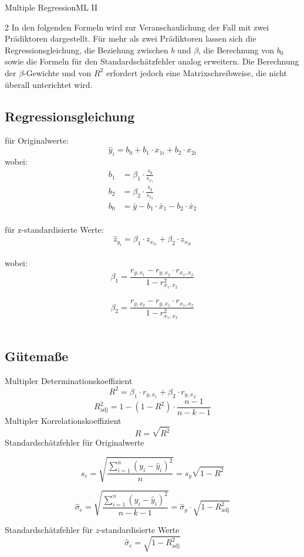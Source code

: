 \begin{formulaBox}{Multiple Regression}{ML II}

 \begin{multicols}{2}
In den folgenden Formeln wird zur Veranschaulichung der Fall mit zwei Prädiktoren dargestellt. 
Für mehr als zwei Prädiktoren lassen sich die Regressionsgleichung, die Beziehung zwischen $b$ und $\beta$, 
die Berechnung von $b_0$ sowie die Formeln für den Standardschätzfehler analog erweitern. 
Die Berechnung der $\beta$-Gewichte und von $R^2$ erfordert jedoch eine Matrixschreibweise, die nicht überall unterichtet wird.

    \subsection*{Regressionsgleichung}
für Originalwerte: $$\hat{y}_i=b_0+b_1 \cdot x_{1i} + b_2 \cdot x_{2i}$$
wobei: 
\begin{align*}
b_1&=\beta_1 \cdot \frac{s_y}{s_{x_{1}}}\\
b_2&=\beta_2 \cdot \frac{s_y}{s_{x_{2}}}\\
b_0&=\bar{y}-b_1 \cdot \bar{x}_{1}-b_2 \cdot \bar{x}_2\\
\end{align*}

für z-standardisierte Werte: $$\hat{z}_{y_i}=\beta_1\cdot z_{x_{1i}} + \beta_2\cdot z_{x_{2i}}$$ \\
wobei: $$\beta_1=\frac{r_{y,x_1}-r_{y,x_2}\cdot r_{x_1,x_2}}{1-r^2_{x_1,x_2}}$$ \ $$\beta_2=\frac{r_{y,x_2}-r_{y,x_1} \cdot r_{x_1,x_2}}{1-r^2_{x_1,x_2}}$$\\

\columnbreak
    \subsection*{Gütemaße}

Multipler Determinationskoeffizient
$$R^2=\beta_1 \cdot r_{y,x_1} + \beta_2 \cdot r_{y,x_2}$$
$$R^2_{\mathrm{adj}}=1-(1-R^2)\cdot\frac{n-1}{n-k-1} $$
Multipler Korrelationskoeffizient
$$R=\sqrt{R^2}$$
Standardschätzfehler für Originalwerte

$$s_e=\sqrt{\frac{\sum\limits_{i=1}^n(y_i-\hat{y}_i)^2}{n}} = s_y \sqrt{1-R^2}$$

$$\hat{\sigma}_e = \sqrt{\frac{\sum\limits_{i=1}^n(y_i-\hat{y}_i)^2}{n-k-1}} = \hat{\sigma}_y \cdot \sqrt{1-R^2_{\mathrm{adj}}}$$

Standardschätzfehler für $z$-standardisierte Werte
$$\hat{\sigma}_e=\sqrt{1-R^2_{\mathrm{adj}}}$$

\end{multicols}
\end{formulaBox}
